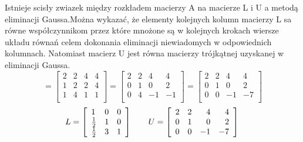 \documentclass[a4paper, 12pt]{article}
\begin{document}
Istnieje scisły zwiazek między rozkładem macierzy A na macierze L i U a metodą eliminacji Gaussa.Można wykazać, że elementy kolejnych kolumn macierzy L sa równe współczynnikom przez które mnożone są w kolejnych krokach wiersze układu równań celem dokonania eliminacji niewiadomych w odpowiednich kolumnach. Natomiast macierz U jest równa macierzy trójkątnej uzyskanej w eliminacji Gaussa.
\begin{equation*}
[A\vert b]=\left[ \begin{array}{llll}
2 & 2 & 4 & 4\\
1 & 2 & 2 & 4\\
1 & 4 & 1 & 1\\
\end{array}
\right] = \left[ \begin{array}{llrr}
2 & 2 & 4 & 4\\
0 & 1 & 0 & 2\\
0 & 4 & -1 & -1\\
\end{array}
\right]= \left[ \begin{array}{llrr}
2 & 2 & 4 & 4\\
0 & 1 & 0 & 2\\
0 & 0 & -1 & -7\\
\end{array}
\right]
\end{equation*}
\begin{equation*}
L=\left[ \begin{array}{lll}
1 & 0 & 0\\
\frac{1}{2} & 1 & 0\\
\frac{1}{2} & 3 & 1\\
\end{array} \right] \qquad
U=\left[ \begin{array}{llrr}
2 & 2 & 4 & 4\\
0 & 1 & 0 & 2\\
0 & 0 & -1 & -7\\
\end{array} \right] \\
\end{equation*}
\end{document}
